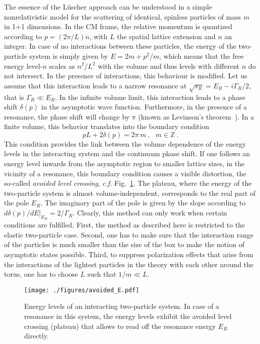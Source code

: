 The essence of the L\"uscher approach can be understood in a simple
nonrelativistic model for the scattering of identical, spinless particles of
mass $m$ in 1+1 dimensions.
In the CM frame, the relative momentum is quantized according to $p =(2\pi/L)n$,
with $L$ the spatial lattice extension and $n$ an integer. In case of no
interactions between these particles, the energy of the two-particle system is
simply given by $E=2m+p^2/m$, which means that the free energy level-$n$ scales
as $n^2/L^2$ with the volume and thus levels with different $n$ do not
intersect. In the presence of interactions, this behaviour is modified. Let us
assume that this interaction leads to a narrow resonance at $\sqrt{s_R} = E_R -
i\Gamma_R/2$, that is $\Gamma_R \ll E_R$. In the infinite volume limit, this
interaction leads to a phase shift $\delta (p)$  in the asymptotic wave
function. Furthermore, in the presence of a resonance, the phase shift will
change by $\pi$ (known as Levinson's theorem~\cite{Levinson:1949zz}).
In a finite volume, this behavior translates into the boundary condition
\begin{equation}
p L + 2\delta(p) = 2\pi \, m~,~~~m\in {\mathbb Z}~ .
\end{equation}
This condition provides the link between the volume dependence of the
energy levels in the interacting system and the continuum phase shift.
If one follows an energy level inwards from the asymptotic region to
smaller lattice sizes, in the vicinity of a resonance, this boundary 
condition causes a visible distortion, the so-called {\em avoided level
crossing}, {\sl c.f.} Fig.~\ref{fig:avoided}. The plateau, where the energy of
the two-particle system is almost volume-independent, corresponds to the real
part of the pole $E_R$. The imaginary part of the pole is given by the slope
according to $\left.d \delta(p)/dE\right|_{E_R} = 2/\Gamma_R$. Clearly, this method can only
work when certain conditions are fulfilled. First, the method as described 
here is restricted to the elastic two-particle case. Second, one has to make
sure that the interaction range of the particles is much smaller than the
size of the box to make the notion of asymptotic states possible. Third,
to suppress polarization effects that arise from the interactions of the 
lightest particles in the theory with each other around the torus, one
has to choose $L$ such that $1/m \ll L$.

\begin{figure}[t!]
\begin{center}
 \texttt{[image: ./figures/avoided\_E.pdf]}
\caption{Energy levels of an interacting two-particle system. In
case of a resonance in this system, the energy levels exhibit the
avoided level crossing (plateau) that allows to read off the 
resonance energy $E_R$ directly.} 
\label{fig:avoided}
\end{center}
\end{figure}

